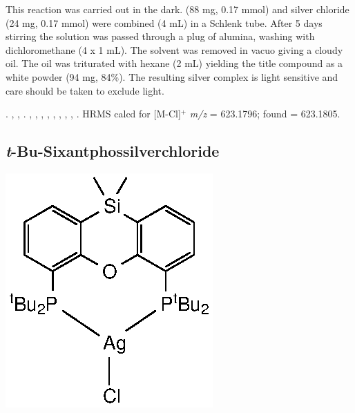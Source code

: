 This reaction was carried out in the dark.   (88 mg, 0.17 mmol) and silver chloride (24 mg, 0.17 mmol) were combined  (4 mL) in a Schlenk tube.  After 5 days stirring the solution was passed through a plug of alumina, washing with dichloromethane (4 x 1 mL).  The solvent was removed in vacuo giving a cloudy oil.  The oil was triturated with hexane (2 mL) yielding the title compound as a white powder (94 mg, 84\%).  The resulting silver complex is light sensitive and care should be taken to exclude light.


.
,
,
.
,
,
,
,
,
, 
, 
,
.
HRMS calcd for  [M-Cl]$^+$ \emph{m/z} = 623.1796; found = 623.1805.



\subsection*{\emph{t}-Bu-Sixantphossilverchloride} 
\begin{structure}[h]
\begin{center}
\includegraphics{../Structures/SitBuSilverChloride.eps}
\end{center}
\end{structure}

